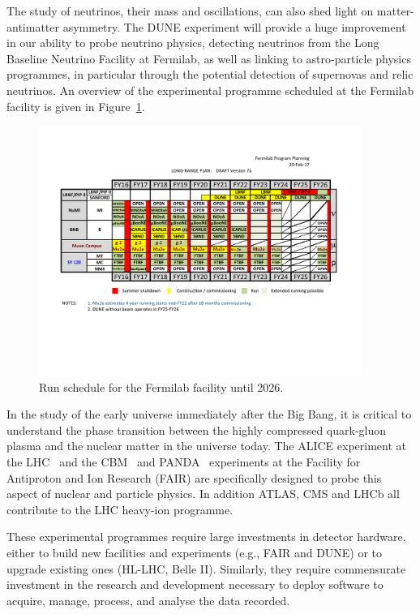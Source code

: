 \documentclass[12pt,a4paper]{article}
\begin{document}
The study of neutrinos, their mass and oscillations, can also shed light
on matter-antimatter asymmetry. The DUNE experiment will provide a huge
improvement in our ability to probe neutrino physics, detecting
neutrinos from the Long Baseline Neutrino Facility at Fermilab, as well
as linking to astro-particle physics programmes, in particular through
the potential detection of supernovas and relic neutrinos. An overview
of the experimental programme scheduled at the Fermilab facility is
given in Figure~\ref{fig:fnal-if}.

\begin{figure}
\vspace*{0.3cm}
    \centering
    \includegraphics[width=0.94\textwidth]{10yr-PLAN-9Feb-2017-V7a.pdf}
    \caption{Run schedule for the Fermilab facility until 2026.}
    \label{fig:fnal-if}
\end{figure}

In the study of the early universe immediately after the Big Bang, it is
critical to understand the phase transition between the highly
compressed quark-gluon plasma and the nuclear matter in the universe
today. The ALICE experiment at the LHC~\cite{ALICE} and
the CBM~\cite{CBM} and PANDA~\cite{PANDA} experiments at the Facility for Antiproton and Ion
Research (FAIR) are specifically designed to probe this aspect of
nuclear and particle physics. In addition ATLAS, CMS and LHCb all
contribute to the LHC heavy-ion programme.

These experimental programmes require large investments in detector
hardware, either to build new facilities and experiments (e.g., FAIR and DUNE) or to upgrade existing ones (HL-LHC, Belle II). Similarly, they
require commensurate investment in the research and development
necessary to deploy software to acquire, manage, process, and analyse
the data recorded.
\end{document}
